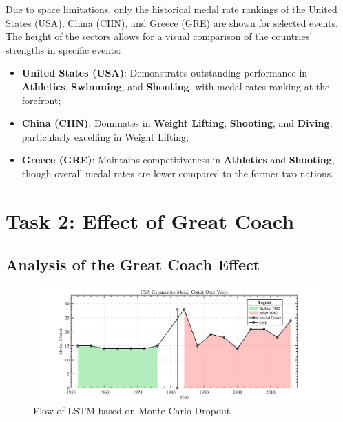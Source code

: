 \documentclass{mcmthesis}
\begin{document}
Due to space limitations, only the historical medal rate rankings of the United States (USA), China (CHN), and Greece (GRE) are shown for selected events. The height of the sectors allows for a visual comparison of the countries' strengths in specific events:

\begin{itemize}
	\item \textbf{United States (USA)}: Demonstrates outstanding performance in \textbf{Athletics}, \textbf{Swimming}, and \textbf{Shooting}, with medal rates ranking at the forefront;
	\item \textbf{China (CHN)}: Dominates in \textbf{Weight Lifting}, \textbf{Shooting}, and \textbf{Diving}, particularly excelling in Weight Lifting;
	\item \textbf{Greece (GRE)}: Maintains competitiveness in \textbf{Athletics} and \textbf{Shooting}, though overall medal rates are lower compared to the former two nations.
\end{itemize}
\section{Task 2: Effect of Great Coach}



\subsection{Analysis of the Great Coach Effect}

%

\begin{figure}[H]
	\centering
	\includegraphics[width=1\linewidth]{fig/USA-GYM.png}
	\caption{Flow of LSTM based on Monte Carlo Dropout}
	\label{fig:USA-GYM}
\end{figure}
\end{document}
